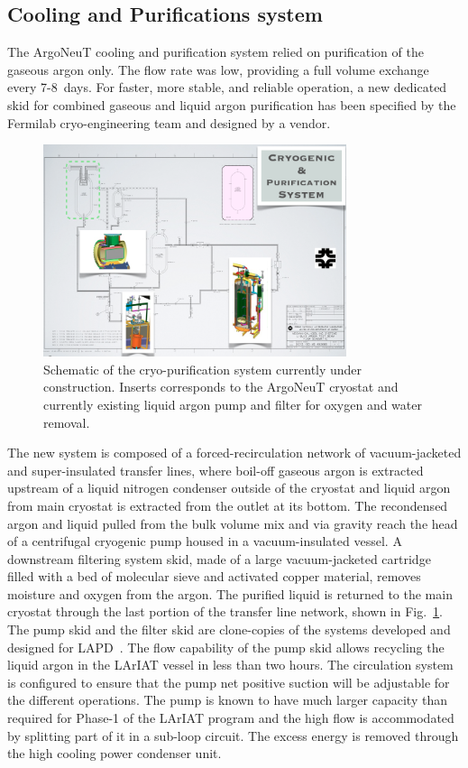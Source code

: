 \documentclass[DIV=calc, paper=a4, fontsize=10pt, twocolumn]{scrartcl}	 %
\begin{document}
{\subsection{Cooling and Purifications system}

The ArgoNeuT cooling and purification system relied on purification of the gaseous argon only. The flow rate was low, providing a full volume exchange every 7-8~days. For faster, more stable, and reliable operation, a new dedicated skid for combined gaseous and liquid argon purification has been specified by the Fermilab cryo-engineering team and designed by a vendor.
\begin{figure}[h!]
\centering
\includegraphics[width=3.5in]{Figures/cryosystem}
\caption{ {\scriptsize \sf  Schematic of the cryo-purification system currently under construction. Inserts corresponds to the ArgoNeuT cryostat and currently existing liquid argon pump and filter for oxygen and water removal.} }
\label{fig:uB-pump-filter}
\end{figure}
The new system is composed of a forced-recirculation network of vacuum-jacketed and super-insulated transfer lines, where boil-off gaseous argon is extracted upstream of a liquid nitrogen condenser outside of the cryostat and liquid argon from main cryostat is extracted from the outlet at its bottom. The recondensed argon and liquid pulled from the bulk volume mix and via gravity reach the head of a centrifugal cryogenic pump housed in a vacuum-insulated vessel. A downstream filtering system skid, made of a large vacuum-jacketed cartridge filled with a bed of molecular sieve and activated copper material, removes moisture and oxygen from the argon. The purified liquid is
returned to the main cryostat through the last portion of the transfer line network, shown in Fig.~\ref{fig:uB-pump-filter}.  The pump skid and the filter skid are clone-copies of the systems developed and designed for LAPD~\cite{LAPD}.  The flow capability of the pump skid allows recycling the liquid argon in the LArIAT vessel in less than two hours. The circulation system is configured to ensure that the pump net positive suction will be adjustable  for the different operations. The pump is known to have much larger capacity than required for Phase-1 of the LArIAT program and the high flow is accommodated by splitting part of it in a sub-loop circuit. The excess energy is removed through the high cooling power condenser unit.

}
\end{document}
